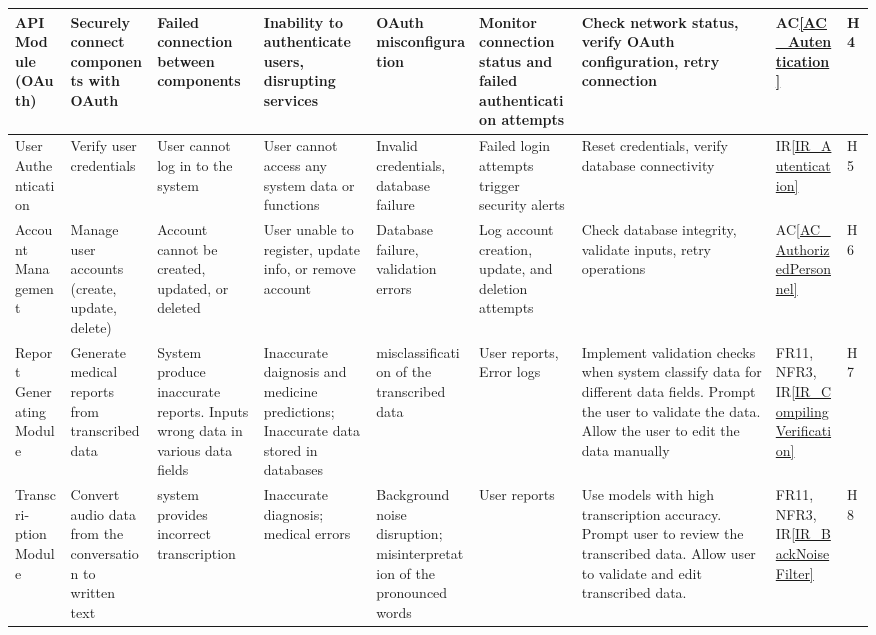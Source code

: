 \documentclass{article}
\begin{document}
\begin{landscape}
\begin{longtable}{|p{1.5cm}|p{2cm}|p{2.6cm}|p{2cm}|p{2cm}|p{2cm}|p{3.5cm}|p{1cm}|p{0.8cm}|}
        \midrule
        API Module (OAuth) & \raggedright Securely connect components with OAuth & \raggedright Failed connection between components & \raggedright Inability to authenticate users, disrupting services & \raggedright OAuth misconfiguration & \raggedright Monitor connection status and failed authentication attempts & \raggedright Check network status, verify OAuth configuration, retry connection & AC\ref{AC_Autentication} & H4 \\
        \midrule
        User Authentication & \raggedright Verify user credentials & \raggedright User cannot log in to the system & \raggedright User cannot access any system data or functions & \raggedright Invalid credentials, database failure & \raggedright Failed login attempts trigger security alerts & \raggedright Reset credentials, verify database connectivity & IR\ref{IR_Autentication} & H5 \\
        \midrule
        Account Management & \raggedright Manage user accounts (create, update, delete) & \raggedright Account cannot be created, updated, or deleted & \raggedright User unable to register, update info, or remove account & \raggedright Database failure, validation errors & \raggedright Log account creation, update, and deletion attempts & \raggedright Check database integrity, validate inputs, retry operations & AC\ref{AC_AuthorizedPersonnel} & H6 \\ 
        \midrule
        Report Generating Module & \raggedright Generate medical reports from transcribed data & \raggedright System produce inaccurate reports. Inputs wrong data in various data fields & \raggedright Inaccurate daignosis and medicine predictions; Inaccurate data stored in databases & \raggedright misclassification of the transcribed data & \raggedright User reports, Error logs & \raggedright Implement validation checks when system classify data for different data fields. Prompt the user to validate the data. Allow the user to edit the data manually &  FR11, NFR3, IR\ref{IR_CompilingVerification} & H7 \\
        \midrule
        Transcri-ption Module & \raggedright Convert audio data from the conversation to written text & \raggedright system provides incorrect transcription & \raggedright Inaccurate diagnosis; medical errors & \raggedright Background noise disruption; misinterpretation of the pronounced words & \raggedright User reports & \raggedright Use models with high transcription accuracy. Prompt user to review the transcribed data. Allow user to validate and edit transcribed data. & FR11, NFR3, IR\ref{IR_BackNoiseFilter} & H8 \\ 

\end{longtable}
\end{landscape}
\end{document}
